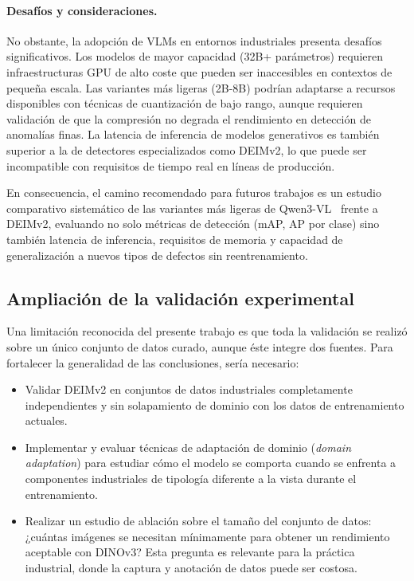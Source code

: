 \paragraph{Desafíos y consideraciones.}

No obstante, la adopción de VLMs en entornos industriales presenta desafíos significativos. Los modelos de mayor capacidad (32B+ parámetros) requieren infraestructuras GPU de alto coste que pueden ser inaccesibles en contextos de pequeña escala. Las variantes más ligeras (2B-8B) podrían adaptarse a recursos disponibles con técnicas de cuantización de bajo rango, aunque requieren validación de que la compresión no degrada el rendimiento en detección de anomalías finas. La latencia de inferencia de modelos generativos es también superior a la de detectores especializados como DEIMv2, lo que puede ser incompatible con requisitos de tiempo real en líneas de producción.

En consecuencia, el camino recomendado para futuros trabajos es un estudio comparativo sistemático de las variantes más ligeras de Qwen3-VL~\cite{bai2025qwen3vl} frente a DEIMv2, evaluando no solo métricas de detección (mAP, AP por clase) sino también latencia de inferencia, requisitos de memoria y capacidad de generalización a nuevos tipos de defectos sin reentrenamiento.

\subsection{Ampliación de la validación experimental}

Una limitación reconocida del presente trabajo es que toda la validación se realizó sobre un único conjunto de datos curado, aunque éste integre dos fuentes. Para fortalecer la generalidad de las conclusiones, sería necesario:

\begin{itemize}
    \item Validar DEIMv2 en conjuntos de datos industriales completamente independientes y sin solapamiento de dominio con los datos de entrenamiento actuales.
    \item Implementar y evaluar técnicas de adaptación de dominio (\textit{domain adaptation}) para estudiar cómo el modelo se comporta cuando se enfrenta a componentes industriales de tipología diferente a la vista durante el entrenamiento.
    \item Realizar un estudio de ablación sobre el tamaño del conjunto de datos: ¿cuántas imágenes se necesitan mínimamente para obtener un rendimiento aceptable con DINOv3? Esta pregunta es relevante para la práctica industrial, donde la captura y anotación de datos puede ser costosa.
\end{itemize}

